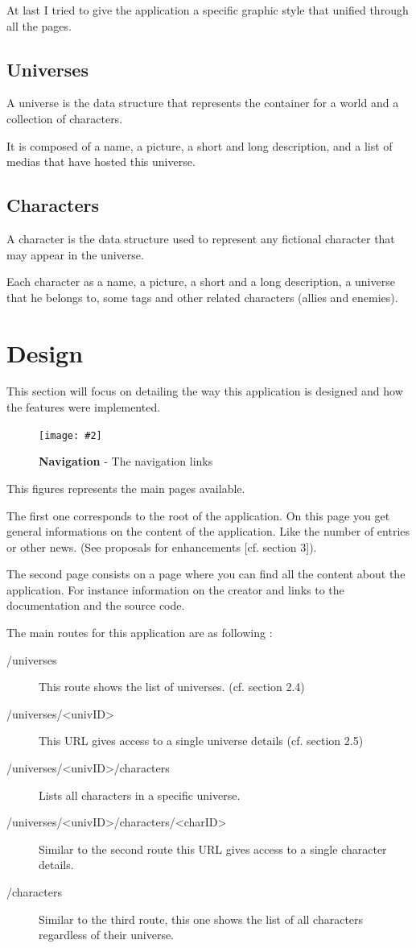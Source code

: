\documentclass[10pt, a4paper]{article}
\newcommand{\figuremacro}[5]{
    \begin{figure}[#1]
        \centering
        \texttt{[image: \#2]}
        \caption[#3]{\textbf{#3}#4}
        \label{fig:#2}
    \end{figure}
}
\begin{document}
    At last I tried to give the application a specific graphic style that unified through all the pages.
    
    \subsection{Universes}
    A universe is the data structure that represents the container for a world and a collection of characters.
    
    It is composed of a name, a picture, a short and long description, and a list of medias that have hosted this universe.
    
    \subsection{Characters}
    A character is the data structure used to represent any fictional character that may appear in the universe.
    
    Each character as a name, a picture, a short and a long description, a universe that he belongs to, some tags and other related characters (allies and enemies).
    
	\section{Design}
	This section will focus on detailing the way this application is designed and how the features were implemented.
	
	\figuremacro{h}{nav}{Navigation}{ - The navigation links}{0.4}
	
	This figures represents the main pages available.
	
	The first one corresponds to the root of the application. On this page you get general informations on the content of the application. Like the number of entries or other news. (See proposals for enhancements [cf. section 3]).
	
	The second page consists on a page where you can find all the content about the application. For instance information on the creator and links to the documentation and the source code.
	
	The main routes for this application are as following :
	\begin{description}
		\item[/universes] This route shows the list of universes. (cf. section 2.4)
		\item[/universes/<univID>] This URL gives access to a single universe details (cf. section 2.5)
		\item[/universes/<univID>/characters] Lists all characters in a specific universe.
		\item[/universes/<univID>/characters/<charID>] Similar to the second route this URL gives access to a single character details.
		\item[/characters] Similar to the third route, this one shows the list of all characters regardless of their universe.
	\end{description}
	
\end{document}
